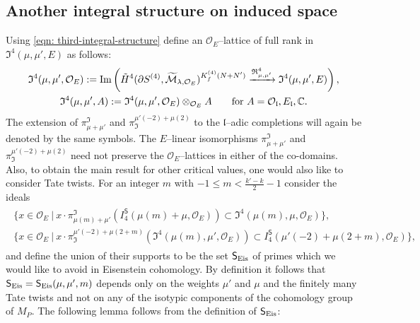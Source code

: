 \documentclass[11pt]{amsart}
\newcommand{\mirf}[1]{K_f^{(4)}(#1)}
\begin{document}
\subsection{Another integral structure on induced space}
\label{section: another-integral-structure}
Using \eqref{eqn: third-integral-structure} define an $\mathcal{O}_E$--lattice of full rank in $\mathfrak{I}^4(\mu,\mu',E)$ as follows:
\begin{gather*}
	\mathfrak{I}^4(\mu,\mu',\mathcal{O}_E) := \textup{Im}\left( \tilde{H}^4(\partial S^{(4)},\widetilde{\mathcal{M}}_{\lambda, \mathcal{O}_E})^{\mirf{N+N'}}
	 \xrightarrow{\mathfrak{R}^4_{\mu,\mu'}} \mathfrak{I}^4(\mu,\mu',E) \right),\\
	\mathfrak{I}^4(\mu,\mu',A) := \mathfrak{I}^4(\mu,\mu',\mathcal{O}_E)\otimes_{\mathcal{O}_E} A \qquad\text{for }A=\mathcal{O}_\mathfrak{l}, E_\mathfrak{l}, \mathbb{C}.
\end{gather*}
The extension of $\pi_{\mu+\mu'}^\mathfrak{I}$ and $\pi_{\mathfrak{I}}^{\mu'(-2) + \mu(2)}$ to the $\mathfrak{l}$--adic completions will again be denoted by the same symbols.
The $E$--linear isomorphisms $\pi_{\mu+\mu'}^\mathfrak{I}$ and $\pi_{\mathfrak{I}}^{\mu'(-2)+\mu(2)}$ need not 
preserve the $\mathcal{O}_E$--lattices in either of the co-domains. Also, to obtain the main result for other critical values, one would also like to consider 
Tate twists. For an integer $m$ with $-1 \leq m <\frac{k'-k}{2}-1$ consider the ideals 
\begin{gather} 
	\begin{aligned}
		\{ x \in \mathcal{O}_E \ | \  x \cdot \pi_{\mu(m) + \mu'}^\mathfrak{I} \left(I_4^\mathsf{S}(\mu(m)+ \mu,\mathcal{O}_E)\right) \subset \mathfrak{I}^4(\mu(m), \mu,\mathcal{O}_E) \},\\
		\{ x \in \mathcal{O}_E \ |\ x \cdot \pi^{\mu'(-2) + \mu(2+m)}_\mathfrak{I} 
		\left(\mathfrak{I}^4(\mu(m), \mu' , \mathcal{O}_E) \right) \subset I_4^\mathsf{S}(\mu'(-2) + \mu(2+m), \mathcal{O}_E)\}, 
	\end{aligned}
\end{gather}
and define the union of their supports to be the set $\mathsf{S}_{\textup{Eis}}$ of primes which we would like to avoid in Eisenstein cohomology. 
By definition it follows that $\mathsf{S}_{\textup{Eis}} = \mathsf{S}_{\textup{Eis}}(\mu,\mu',m)$ 
depends only on the weights $\mu'$ and $\mu$ and the finitely many Tate twists and not on any of the isotypic components of the cohomology group of $M_P.$
The following lemma follows from the definition of $\mathsf{S}_{\textup{Eis}}$: 
\end{document}

